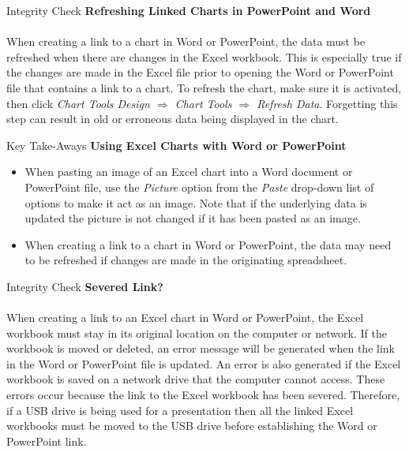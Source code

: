 \begin{center}
	\begin{infobox}{Integrity Check}
		\textbf{Refreshing Linked Charts in PowerPoint and Word}
		\\
		\\
		When creating a link to a chart in Word or PowerPoint, the data must be refreshed when there are changes in the Excel workbook. This is especially true if the changes are made in the Excel file prior to opening the Word or PowerPoint file that contains a link to a chart. To refresh the chart, make sure it is activated, then click \textit{Chart Tools Design $ \Rightarrow $ Chart Tools $ \Rightarrow $ Refresh Data}. Forgetting this step can result in old or erroneous data being displayed in the chart.
	\end{infobox}
\end{center}

\begin{center}
	\begin{tkwbox}{Key Take-Aways}
		\textbf{Using Excel Charts with Word or PowerPoint}
		\\
		\begin{itemize}
			\setlength{\itemsep}{0pt}
			\setlength{\parskip}{0pt}
			\setlength{\parsep}{0pt}

			\item When pasting an image of an Excel chart into a Word document or PowerPoint file, use the \textit{Picture} option from the \textit{Paste} drop-down list of options to make it act as an image. Note that if the underlying data is updated the picture is not changed if it has been pasted as an image.
			\item When creating a link to a chart in Word or PowerPoint, the data may need to be refreshed if changes are made in the originating spreadsheet. 
					
		\end{itemize}
	\end{tkwbox}
\end{center}

\begin{center}
	\begin{infobox}{Integrity Check}
		\textbf{Severed Link?}
		\\
		\\
		When creating a link to an Excel chart in Word or PowerPoint, the Excel workbook must stay in its original location on the computer or network. If the workbook is moved or deleted, an error message will be generated when the link in the Word or PowerPoint file is updated. An error is also generated if the Excel workbook is saved on a network drive that the computer cannot access. These errors occur because the link to the Excel workbook has been severed. Therefore, if a USB drive is being used for a presentation then all the linked Excel workbooks must be moved to the USB drive before establishing the Word or PowerPoint link.
	\end{infobox}
\end{center}

